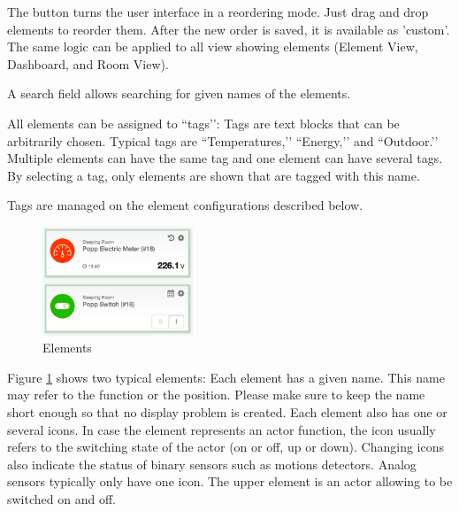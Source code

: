 The button  turns the user interface in a reordering mode. Just drag and drop 
elements to reorder them. After the new order is saved, it is available as 'custom'. The 
same logic can be applied to all view showing elements (Element View, Dashboard, and Room 
View).

A search field allows searching for given names of the elements.

All elements can be assigned to ``tags’’: Tags are text blocks that can be arbitrarily 
chosen. Typical tags are ``Temperatures,’’ ``Energy,’’ and ``Outdoor.’’  Multiple elements 
can have the same tag and one element can have several tags. By selecting a tag, only 
elements are shown that are tagged with this name.

Tags are managed on the element configurations described below.

\begin{figure}
\begin{center}
\includegraphics[width=0.4\textwidth]{pngs/cap4/sh4.png}
\caption{Elements}
\label{sh4}
\end{center}
\end{figure}

Figure \ref{sh4} shows two typical elements:
Each element has a given name. This name may refer to the function or the position. Please 
make sure to keep the name short enough so that no display problem is created. Each element 
also has one or several icons. In case the element represents an actor function, the icon 
usually refers to the switching state of the actor (on or off, up or down). Changing icons 
also indicate the status of binary sensors such as motions detectors.
Analog sensors typically only have one icon. The upper element is an actor allowing to 
be switched on and off. 


